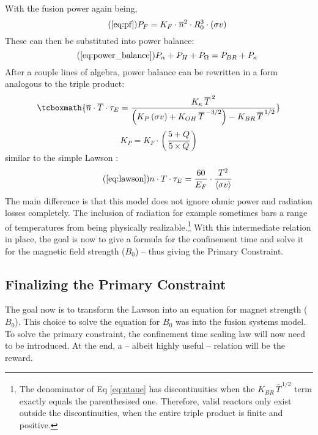 With the fusion power again being,
\begin{equation}
	\tag{\ref{eq:pf}}
	P_F = K_F \cdot \overline{n}^2 \cdot R_0^3  \cdot (\sigma v)
\end{equation}
These can then be substituted into power balance:
\begin{equation}
	\tag{\ref{eq:power_balance}}
	P_\alpha + P_H + P_\Omega = P_{BR} + P_\kappa
\end{equation}
After a couple lines of algebra, power balance can be rewritten in a form analogous to the triple product:
\begin{equation}
	\label{eq:ntaue}
	\tcboxmath{
	 \overline{n}  \cdot \overline{T} \cdot \tau_E = \frac{ K_\kappa \, \overline{T}^{\,2} }{ \left( K_P \, (\sigma v) +  K_{OH} \, \overline{T}^{  \,-3/2 } \right) - K_{BR} \, \overline{T}^{  \,1/2 } }
	 }
\end{equation}
\begin{equation}
	K_P = K_F \cdot \left( \frac{5 + Q}{5 \times Q} \right)
\end{equation}
 similar to the simple Lawson :
\begin{equation}
	\tag{\ref{eq:lawson}}
	n \cdot T \cdot \tau_E = \frac{ 60 }{ E_F } \cdot \frac{ T ^ 2 }{ \langle \sigma v \rangle }
\end{equation}
The main difference is that this model does not ignore ohmic power and radiation losses completely. The inclusion of radiation for example sometimes bars a range of temperatures from being physically realizable.\footnote{The denominator of Eq \ref{eq:ntaue} has discontinuities when the $K_{BR} \, \overline{T}^{  \,1/2 }$ term exactly equals the parenthesised one. Therefore, valid reactors only exist outside the discontinuities, when the entire triple product is finite and positive. } With this intermediate relation in place, the goal is now to give a formula for the confinement time and solve it for the magnetic field strength ($B_0$) -- thus giving the Primary Constraint.

\subsection{Finalizing the Primary Constraint}

The goal now is to transform the Lawson  into an equation for magnet strength ($B_0$). This choice to solve the equation for $B_0$ was  into the fusion systems model. To solve the primary constraint, the confinement time scaling law will now need to be introduced. At the end, a  -- albeit highly useful -- relation will be the reward.

